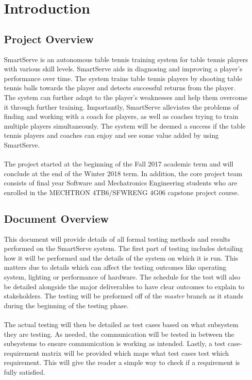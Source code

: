 \documentclass[11pt]{article}
\begin{document}
\section{Introduction}
\subsection{Project Overview}
SmartServe is an autonomous table tennis training system for table tennis players with various skill levels. SmartServe aids in diagnosing and improving a player's performance over time. The system trains table tennis players by shooting table tennis balls towards the player and detects successful returns from the player. The system can further adapt to the player's weaknesses and help them overcome it through further training. Importantly, SmartServe alleviates the problems of finding and working with a coach for players, as well as coaches trying to train multiple players simultaneously. The system will be deemed a success if the table tennis players and coaches can enjoy and see some value added by using SmartServe.\\\\
The project started at the beginning of the Fall 2017 academic term and will conclude at the end of the Winter 2018 term. In addition, the core project team consists of final year Software and Mechatronics Engineering students who are enrolled in the MECHTRON 4TB6/SFWRENG 4G06 capstone project course.
\subsection{Document Overview}
This document will provide details of all formal testing methods and results performed on the SmartServe system. The first part of testing includes detailing how it will be performed and the details of the system on which it is run. This matters due to details which can affect the testing outcomes like operating system, lighting or performance of hardware. The schedule for the test will also be detailed alongside the major deliverables to have clear outcomes to explain to stakeholders. The testing will be preformed off of the \textit{master} branch as it stands during the beginning of the testing phase. \\ \\
The actual testing will then be detailed as test cases based on what subsystem they are testing. As needed, the communication will be tested in between the subsystems to ensure communication is working as intended. Lastly, a test case-requirement matrix will be provided which maps what test cases test which requirement. This will give the reader a simple way to check if a requirement is fully satisfied.
\end{document}

